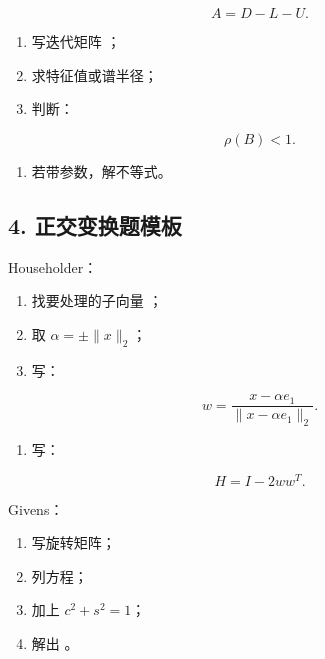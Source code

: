 \documentclass[11pt,a4paper]{ctexart}
\newcommand{\code}[1]{\begingroup\ttfamily\small #1\endgroup}
\begin{document}
\[
A=D-L-U.
\]

\begin{enumerate}

\item 写迭代矩阵 \code{}；

\item 求特征值或谱半径；

\item 判断：

\end{enumerate}

\[
\rho(B)<1.
\]

\begin{enumerate}

\item 若带参数，解不等式。

\end{enumerate}


\subsection*{4. 正交变换题模板}


Householder：

\begin{enumerate}

\item 找要处理的子向量 \code{}；

\item 取 $\alpha=\pm \|x\|_2$；

\item 写：

\end{enumerate}

\[
w=\frac{x-\alpha e_1}{\|x-\alpha e_1\|_2}.
\]

\begin{enumerate}

\item 写：

\end{enumerate}

\[
H=I-2ww^T.
\]

Givens：

\begin{enumerate}

\item 写旋转矩阵；

\item 列方程；

\item 加上 $c^2+s^2=1$；

\item 解出 \code{}。

\end{enumerate}
\end{document}
